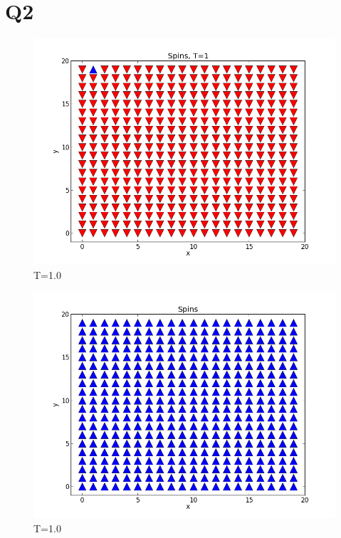 \documentclass[letterpaper,12pt]{article}
\begin{document}
\section*{Q2}

\FloatBarrier
\begin{figure}[H]
\centering
\includegraphics[scale=0.55]{q2_T1.png}
\caption{T=1.0}
\end{figure}
\FloatBarrier

\FloatBarrier
\begin{figure}[H]
\centering
\includegraphics[scale=0.55]{q2_T11.png}
\caption{T=1.0}
\end{figure}
\FloatBarrier
\end{document}
